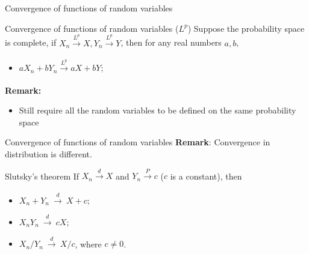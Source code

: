 \documentclass [aspectratio=169]{beamer}
\begin{document}
\begin{frame}{Convergence of functions of random variables}
    \begin{block}{Convergence of functions of random variables ($L^p$)}
     Suppose the probability space is complete, if $X_n  \xrightarrow[]{L^p} X, Y_n  \xrightarrow[]{L^p} Y$, then for any real numbers $a, b$, \begin{itemize}
        \item $aX_n + bY_n  \xrightarrow[]{L^p} aX + bY$;
    \end{itemize}
    \end{block}
    \vspace{0.1in}
    \textbf{Remark:}
    \begin{itemize}
        \item Still require all the random variables to be defined on the same probability space
        
    \end{itemize}
    \vspace{0.5in}
\end{frame}



\begin{frame}{Convergence of functions of random variables}
\textbf{Remark}: Convergence in distribution is different.
\vspace{0.1in}
        \begin{block}{Slutsky's theorem}
   If $X_n \xrightarrow[]{d} X$ and $Y_n \xrightarrow[]{P} c$ ($c$ is a constant), then
\begin{itemize}
    \item $X_{n}+Y_{n}\ {\xrightarrow {d}}\ X+c$;
    \item $X_{n}Y_{n}\ {\xrightarrow {d}}\ cX$;
    \item $X_{n}/Y_{n}\ {\xrightarrow {d}}\ X/c$, where $c \neq 0$.
\end{itemize}
    \end{block}
    \vspace{0.1in}
\end{frame}
\end{document}
